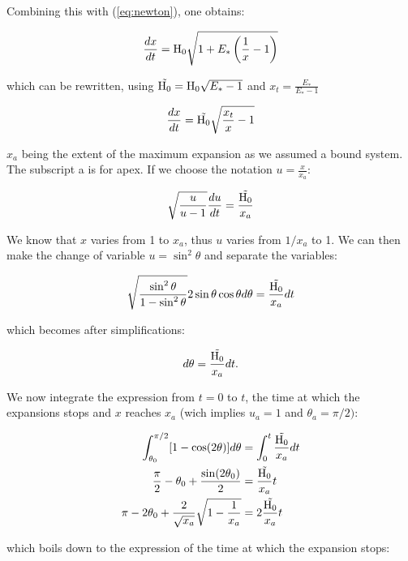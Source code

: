 Combining this with (\ref{eq:newton}), one obtains:

\begin{equation}
\frac{dx}{dt} = {\textrm{H}}_0 \sqrt{1+ E_\ast\left( \frac{1}{x} -1\right)}
\end{equation}

which can be rewritten, using $\tilde{{\textrm{H}}_0} = {\textrm{H}}_0 \sqrt{E_\ast-1}$ and $x_t=\frac{E_\ast}{E_\ast-1}$

\begin{equation}
\frac{dx}{dt} = \tilde{{\textrm{H}}_0} \sqrt{\frac{x_t}{x}-1}
\end{equation}

$x_a$ being the extent of the maximum expansion as we assumed a bound system. The subscript a is for apex. If we choose the notation $u = \frac{x}{x_a}$:

\begin{equation}
\sqrt{\frac{u}{u-1}} \frac{du}{dt} = \frac{\tilde{{\textrm{H}}_0}}{x_a}
\end{equation}

We know that $x$ varies from 1 to $x_a$, thus $u$ varies from $1/x_a$ to 1. We can then make the change of variable $u = \sin^2\theta$ and separate the variables:

\begin{equation}
\sqrt{\frac{\sin^2\theta}{1-\sin^2\theta}} 2 \sin\theta \cos\theta d \theta = \frac{\tilde{{\textrm{H}}_0}}{x_a} dt
\end{equation}

which becomes after simplifications:

\begin{equation}
[ 1 - \cos(2\theta)]d\theta = \frac{\tilde{\Hub_0}}{x_a} dt .
\end{equation}


We now integrate the expression from $t=0$ to $t$, the time at which the expansions stops and $x$ reaches $x_a$ (wich implies $u_a = 1$ and $\theta_a = \pi /2)$:

\begin{align}
\int^{\pi/2}_{\theta_0} [ 1 - \cos(2\theta)]d\theta  & = \int^t_0 \frac{\tilde{{\textrm{H}}_0}}{x_a} dt\\
\frac{\pi}{2} - \theta_0 + \frac{\sin(2\theta_0)}{2} & =  \frac{\tilde{{\textrm{H}}_0}}{x_a} t\\
\pi - 2 \theta_0 + \frac{2}{\sqrt{x_a}}\sqrt{1-\frac{1}{x_a}} & = 2 \frac{\tilde{{\textrm{H}}_0}}{x_a} t 
\end{align}

which boils down to the expression of the time at which the expansion stops:

